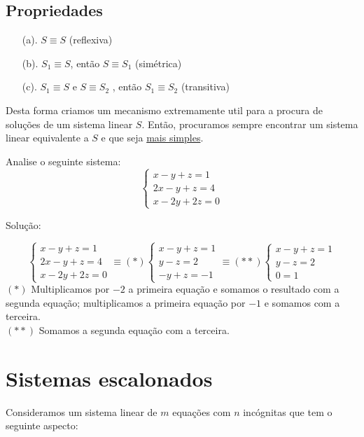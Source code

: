 \subsection*{Propriedades}
\begin{itemize}
	\item[(a).] $S\equiv S$ (reflexiva) 
	\item[(b).] $S_{1} \equiv S$, então $S \equiv S_{1}$ (simétrica)
	\item[(c).] $S_{1} \equiv S$ e $S \equiv S_{2}$ , então $S_{1} \equiv S_{2}$ (transitiva)
\end{itemize}
Desta forma criamos um mecanismo extremamente util para a procura de soluções de um sistema linear $S$. Então, procuramos sempre encontrar um sistema linear equivalente a $S$ e que seja \underline{mais simples}.
\begin{ex}
	Analise o seguinte sistema:\\
	\begin{equation*}
	\begin{cases}
	x-y+z=1 \\
	2x-y+z=4\\
	x-2y+2z=0
	\end{cases}
	\end{equation*} 
\end{ex}
Solução:

\begin{equation*}
\begin{cases}
x-y+z=1 \\
2x-y+z=4\\
x-2y+2z=0
\end{cases} \equiv (*) \begin{cases}
x-y+z=1 \\
y-z=2\\
-y+z=-1
\end{cases} \equiv (**) \begin{cases}
x-y+z=1 \\
y-z=2\\
0=1
\end{cases}
\end{equation*}
$(*)$ Multiplicamos por $-2$ a primeira equação e somamos o resultado com a segunda equação; multiplicamos a primeira equação por $-1$ e somamos com a terceira.\\
$(**)$ Somamos a segunda equação com a terceira. 

\newpage
\section{Sistemas escalonados}
Consideramos um sistema linear de $m$ equações com $n$ incógnitas que tem o seguinte aspecto:

